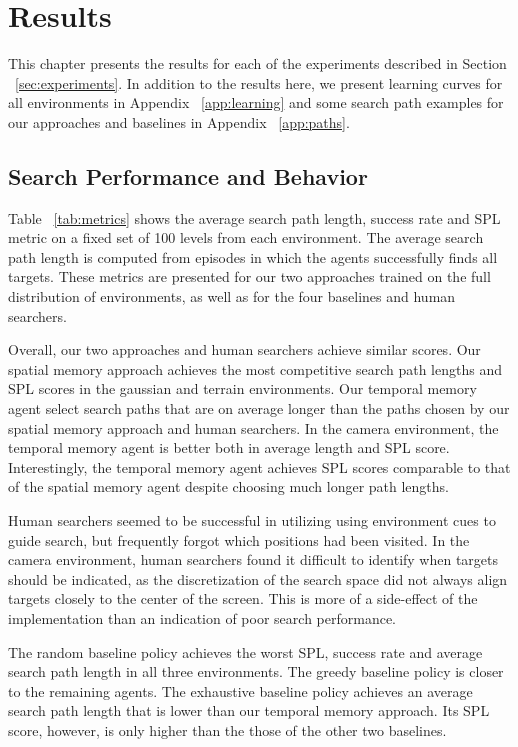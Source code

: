 \chapter{Results}
\label{cha:results}

This chapter presents the results for each of the experiments described in Section ~\ref{sec:experiments}.
In addition to the results here, we present learning curves for all environments in Appendix ~\ref{app:learning} and some search path examples for our approaches and baselines in Appendix ~\ref{app:paths}.


\section{Search Performance and Behavior}

Table ~\ref{tab:metrics} shows the average search path length, success rate and SPL metric on a fixed set of 100 levels from each environment.
The average search path length is computed from episodes in which the agents successfully finds all targets.
These metrics are presented for our two approaches trained on the full distribution of environments, as well as for the four baselines and human searchers.

Overall, our two approaches and human searchers achieve similar scores.
Our spatial memory approach achieves the most competitive search path lengths and SPL scores in the gaussian and terrain environments.
Our temporal memory agent select search paths that are on average longer than the paths chosen by our spatial memory approach and human searchers.
In the camera environment, the temporal memory agent is better both in average length and SPL score.
Interestingly, the temporal memory agent achieves SPL scores comparable to that of the spatial memory agent despite choosing much longer path lengths.

Human searchers seemed to be successful in utilizing using environment cues to guide search, but frequently forgot which positions had been visited.
In the camera environment, human searchers found it difficult to identify when targets should be indicated,
as the discretization of the search space did not always align targets closely to the center of the screen.
This is more of a side-effect of the implementation than an indication of poor search performance.

The random baseline policy achieves the worst SPL, success rate and average search path length in all three environments.
The greedy baseline policy is closer to the remaining agents.
The exhaustive baseline policy achieves an average search path length that is lower than our temporal memory approach.
Its SPL score, however, is only higher than the those of the other two baselines.

